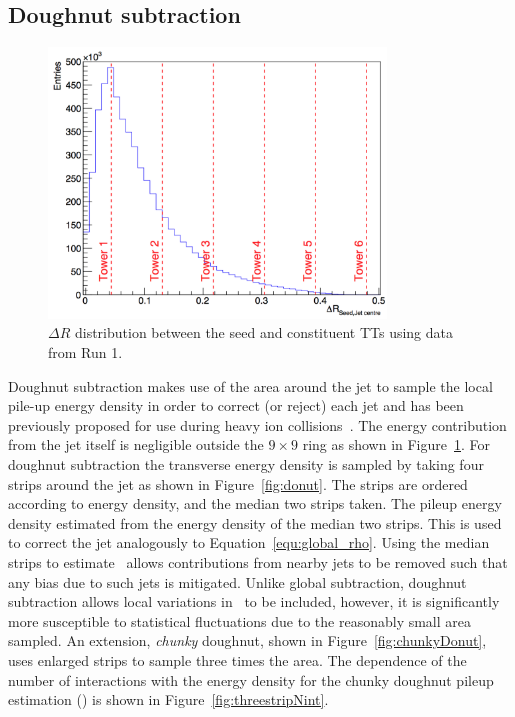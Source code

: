 \subsection{Doughnut subtraction}
\begin{figure}
\centering
    \includegraphics[width=0.8\textwidth]{./Figures/triggerUpgrade/deltaR2}
  \caption{$\Delta R$ distribution between the seed and constituent TTs using data from Run 1.}
  \label{fig:deltaR2}
\end{figure}  


Doughnut subtraction makes use of the area around the jet to sample the local pile-up
energy density in order to correct (or reject) each jet and has been previously proposed
for use during heavy ion collisions~\cite{doughnut}. The energy contribution from the jet
itself is negligible outside the $9\times9$ ring as shown in Figure~\ref{fig:deltaR2}. 
For doughnut subtraction the transverse energy density is sampled by taking four strips around 
the jet as shown in Figure~\ref{fig:donut}. The strips are ordered according to energy density,
and the median two strips taken. The pileup energy density estimated from the 
energy density of the median two strips. This \rhoD is used to correct the
jet analogously to Equation~\ref{equ:global_rho}. Using the median strips to estimate \rhoP~allows
contributions from nearby jets to be removed such that any bias due to such jets is 
mitigated.
Unlike global subtraction, doughnut subtraction allows local variations in \rhoP~to be 
included, however, it is significantly more susceptible to statistical fluctuations due to the 
reasonably small area sampled. An extension, \emph{chunky} doughnut, shown in Figure~\ref{fig:chunkyDonut},
uses enlarged strips to sample three times the area. The dependence of the number of interactions
with the energy density for the chunky doughnut pileup estimation (\rhoC) is shown in Figure~\ref{fig:threestripNint}.

